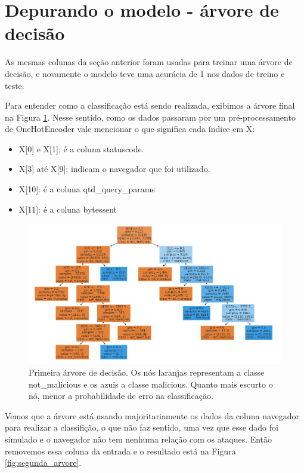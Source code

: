 \section{Depurando o modelo - árvore de decisão}

As mesmas colunas da seção anterior foram usadas para treinar uma árvore de decisão, e novamente
o modelo teve uma acurácia de 1 nos dados de treino e teste. 

Para entender como a classificação está sendo realizada, exibimos a árvore final na Figura \ref{fig:primeira_arvore}. Nesse sentido, 
como os dados passaram por um pré-processamento de OneHotEncoder vale mencionar o que significa cada índice em X:

\begin{itemize}
    \item X[0] e X[1]: é a coluna statuscode.
    \item X[3] até X[9]: indicam o navegador que foi utilizado.
    \item X[10]: é a coluna qtd\_query\_params
    \item X[11]: é a coluna bytessent
\end{itemize}

\begin{figure}
    \centering
    \includegraphics[width=.9\textwidth]{figuras/primeira-arvore.png}
    \caption{Primeira árvore de decisão. Os nós laranjas representam a classe not\_malicious 
    e os azuis a classe malicious. Quanto mais escurto o nó, menor a probabilidade de erro 
    na classificação. \label{fig:primeira_arvore}}    
\end{figure}

Vemos que a árvore está usando majoritariamente os dados da coluna navegador 
para realizar a classifição, o que não faz sentido, uma vez que esse dado foi simulado e o 
navegador não tem nenhuma relação com os ataques. Então removemos essa coluna da entrada 
e o resultado está na Figura \ref{fig:segunda_arvore}.


